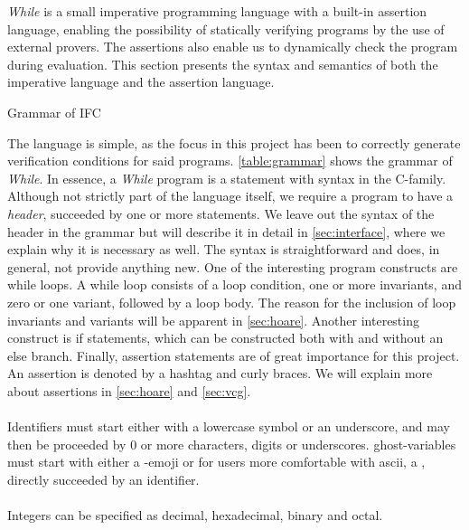 \textit{While} is a small imperative programming language with a built-in assertion language, enabling the possibility of statically verifying programs by the use of external provers.
The assertions also enable us to dynamically check the program during evaluation.
This section presents the syntax and semantics of both the imperative language and the assertion language.


\begin{table}[h!]

\caption{Grammar of IFC}
\label{table:grammar}
\end{table}

The language is simple, as the focus in this project has been to correctly generate verification conditions for said programs.
\cref{table:grammar} shows the grammar of \textit{While}.
In essence, a \textit{While} program is a statement with syntax in the C-family.
Although not strictly part of the language itself, we require a program to have a \textit{header}, succeeded by one or more statements.
We leave out the syntax of the header in the grammar but will describe it in detail in \cref{sec:interface}, where we explain why it is necessary as well.
The syntax is straightforward and does, in general, not provide anything new.
One of the interesting program constructs are while loops. A while loop consists of a loop condition, one or more invariants, and zero or one variant, followed by a loop body. The reason for the inclusion of loop invariants and variants will be apparent in \cref{sec:hoare}.
Another interesting construct is if statements, which can be constructed both with and without an else branch.
Finally, assertion statements are of great importance for this project. An assertion is denoted by a hashtag and curly braces. We will explain more about assertions in \cref{sec:hoare} and \cref{sec:vcg}.
\\~\\
Identifiers must start either with a lowercase symbol or an underscore, and may then be proceeded by 0 or more characters, digits or underscores.
ghost-variables must start with either a -emoji or for users more comfortable with ascii, a \textdollar, directly succeeded by an identifier.
\\~\\
Integers can be specified as decimal, hexadecimal, binary and octal.
